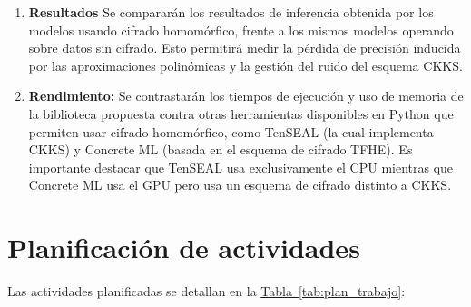 \begin{enumerate}
    \item \textbf{Resultados} Se compararán los resultados de inferencia obtenida por los modelos usando cifrado homomórfico, frente a los mismos modelos operando sobre datos sin cifrado. Esto permitirá medir la pérdida de precisión inducida por las aproximaciones polinómicas y la gestión del ruido del esquema CKKS.
    \item \textbf{Rendimiento:} Se contrastarán los tiempos de ejecución y uso de memoria de la biblioteca propuesta contra otras herramientas disponibles en Python que permiten usar cifrado homomórfico, como TenSEAL \cite{benaissa2021tenseal} (la cual implementa CKKS) y Concrete ML \cite{ConcreteML} (basada en el esquema de cifrado TFHE). Es importante destacar que TenSEAL usa exclusivamente el CPU mientras que Concrete ML usa el GPU pero usa un esquema de cifrado distinto a CKKS.
\end{enumerate}

\section{Planificación de actividades}

Las actividades planificadas se detallan en la \hyperref[tab:plan_trabajo]{Tabla~\ref{tab:plan_trabajo}}:

